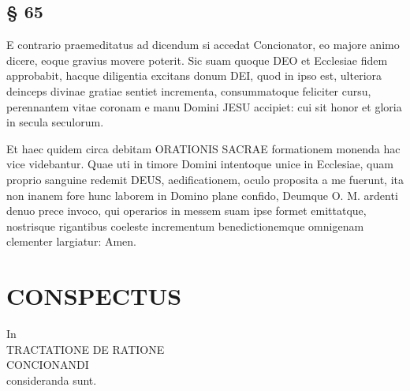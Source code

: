 \subsection{§ 65}

E contrario praemeditatus ad dicendum si accedat Concionator, eo majore animo dicere, eoque gravius movere poterit. Sic suam quoque DEO et Ecclesiae fidem approbabit, hacque diligentia excitans donum DEI, quod in ipso est, ulteriora deinceps divinae gratiae sentiet incrementa, consummatoque feliciter cursu, perennantem vitae coronam e manu Domini JESU accipiet: cui sit honor et gloria in secula seculorum.

\trenner

Et haec quidem circa debitam ORATIONIS SACRAE formationem monenda hac vice videbantur. Quae uti in timore Domini intentoque unice in Ecclesiae, quam proprio sanguine redemit DEUS, aedificationem, oculo proposita a me fuerunt, ita non inanem fore hunc laborem in Domino plane confido, Deumque O. M. ardenti denuo prece invoco, qui operarios in messem suam ipse formet emittatque, nostrisque rigantibus coeleste incrementum benedictionemque omnigenam clementer largiatur: Amen.

\section{CONSPECTUS}

\begin{center}
In\\
TRACTATIONE DE RATIONE\\
CONCIONANDI\\
consideranda sunt.
\end{center}

